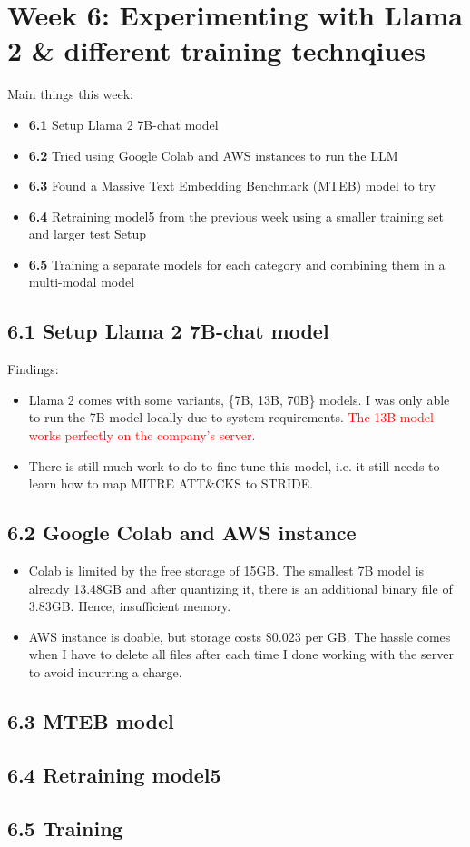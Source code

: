 \section*{Week 6: Experimenting with Llama 2 \& different training technqiues}

Main things this week:
\begin{itemize}[topsep=0pt]
    \item \textbf{6.1} Setup Llama 2 7B-chat model
    \item \textbf{6.2} Tried using Google Colab and AWS instances to run the LLM
    \item \textbf{6.3} Found a \href{https://arxiv.org/pdf/2210.07316.pdf}{Massive Text Embedding Benchmark (MTEB)} model to try
    \item \textbf{6.4} Retraining model5 from the previous week using a smaller training set and larger test Setup
    \item \textbf{6.5} Training a separate models for each category and combining them in a multi-modal model
\end{itemize}

\subsection*{6.1 Setup Llama 2 7B-chat model}
Findings:
\begin{itemize}[topsep=0pt]
    \item Llama 2 comes with some variants, \{7B, 13B, 70B\} models. I was only able to run the 7B model locally due to system requirements. \textcolor{red}{The 13B model works perfectly on the company's server.}
    \item There is still much work to do to fine tune this model, i.e. it still needs to learn how to map MITRE ATT\&CKS to STRIDE.
\end{itemize}


\subsection*{6.2 Google Colab and AWS instance}
\begin{itemize}[topsep=0pt]
    \item Colab is limited by the free storage of 15GB. The smallest 7B model is already 13.48GB and after quantizing it, there is an additional binary file of 3.83GB. Hence, insufficient memory.
    \item AWS instance is doable, but storage costs \$0.023 per GB. The hassle comes when I have to delete all files after each time I done working with the server to avoid incurring a charge.
\end{itemize}
\subsection*{6.3 MTEB model}
\subsection*{6.4 Retraining model5}
\subsection*{6.5 Training}
